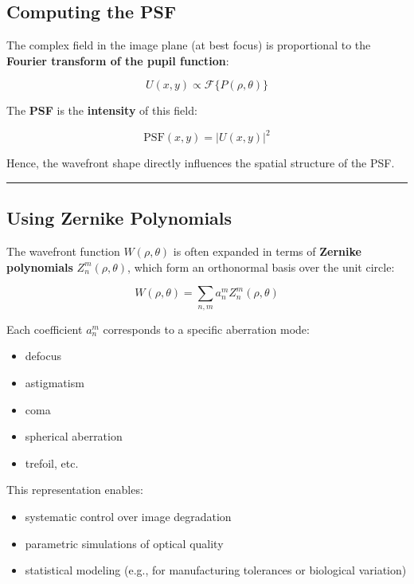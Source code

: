 \documentclass[
  letterpaper,
]{book}
\providecommand{\tightlist}{%
  \setlength{\itemsep}{0pt}\setlength{\parskip}{0pt}}\usepackage{longtable,booktabs,array}
\begin{document}
\subsection{Computing the PSF}\label{computing-the-psf}

The complex field in the image plane (at best focus) is proportional to
the \textbf{Fourier transform of the pupil function}:

\[
U(x, y) \propto \mathcal{F}\{ P(\rho, \theta) \}
\]

The \textbf{PSF} is the \textbf{intensity} of this field:

\[
\text{PSF}(x, y) = |U(x, y)|^2
\]

Hence, the wavefront shape directly influences the spatial structure of
the PSF.

\begin{center}\rule{0.5\linewidth}{0.5pt}\end{center}

\subsection{Using Zernike Polynomials}\label{using-zernike-polynomials}

The wavefront function \(W(\rho, \theta)\) is often expanded in terms of
\textbf{Zernike polynomials} \(Z_n^m(\rho, \theta)\), which form an
orthonormal basis over the unit circle:

\[
W(\rho, \theta) = \sum_{n,m} a_n^m Z_n^m(\rho, \theta)
\]

Each coefficient \(a_n^m\) corresponds to a specific aberration mode:

\begin{itemize}
\tightlist
\item
  defocus
\item
  astigmatism
\item
  coma
\item
  spherical aberration
\item
  trefoil, etc.
\end{itemize}

This representation enables:

\begin{itemize}
\tightlist
\item
  systematic control over image degradation
\item
  parametric simulations of optical quality
\item
  statistical modeling (e.g., for manufacturing tolerances or biological
  variation)
\end{itemize}
\end{document}
